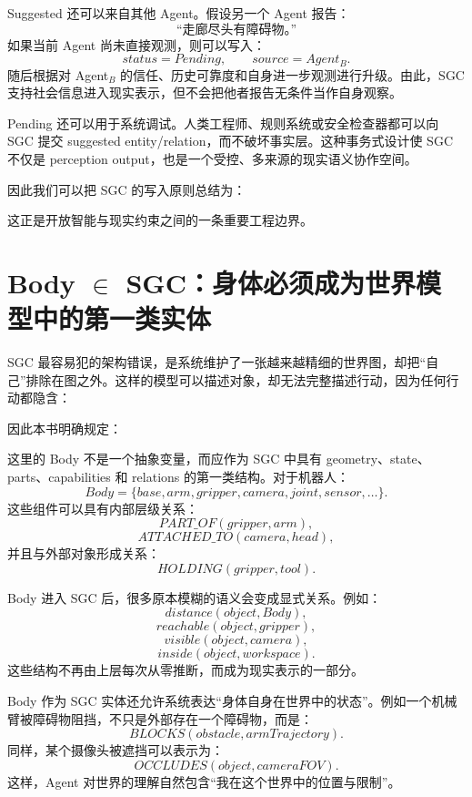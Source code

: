 Suggested 还可以来自其他 Agent。假设另一个 Agent 报告：
\[
\text{“走廊尽头有障碍物。”}
\]
如果当前 Agent 尚未直接观测，则可以写入：
\[
status=Pending,
\qquad
source=Agent_B.
\]
随后根据对 Agent$_B$ 的信任、历史可靠度和自身进一步观测进行升级。由此，SGC 支持社会信息进入现实表示，但不会把他者报告无条件当作自身观察。

Pending 还可以用于系统调试。人类工程师、规则系统或安全检查器都可以向 SGC 提交 suggested entity/relation，而不破坏事实层。这种事务式设计使 SGC 不仅是 perception output，也是一个受控、多来源的现实语义协作空间。

因此我们可以把 SGC 的写入原则总结为：
\begin{statementbox}
\centering
{}
\end{statementbox}
这正是开放智能与现实约束之间的一条重要工程边界。

\section{Body $\in$ SGC：身体必须成为世界模型中的第一类实体}

SGC 最容易犯的架构错误，是系统维护了一张越来越精细的世界图，却把“自己”排除在图之外。这样的模型可以描述对象，却无法完整描述行动，因为任何行动都隐含：
\begin{statementbox}
\centering
{}
\end{statementbox}
因此本书明确规定：
\begin{statementbox}
\centering
{}
\end{statementbox}

这里的 Body 不是一个抽象变量，而应作为 SGC 中具有 geometry、state、parts、capabilities 和 relations 的第一类结构。对于机器人：
\[
Body=
\{
base,
arm,
gripper,
camera,
joint,
sensor,
\ldots
\}.
\]
这些组件可以具有内部层级关系：
\[
PART\_OF(gripper,arm),
\]
\[
ATTACHED\_TO(camera,head),
\]
并且与外部对象形成关系：
\[
HOLDING(gripper,tool).
\]

Body 进入 SGC 后，很多原本模糊的语义会变成显式关系。例如：
\[
distance(object,Body),
\]
\[
reachable(object,gripper),
\]
\[
visible(object,camera),
\]
\[
inside(object,workspace).
\]
这些结构不再由上层每次从零推断，而成为现实表示的一部分。

Body 作为 SGC 实体还允许系统表达“身体自身在世界中的状态”。例如一个机械臂被障碍物阻挡，不只是外部存在一个障碍物，而是：
\[
BLOCKS(obstacle,armTrajectory).
\]
同样，某个摄像头被遮挡可以表示为：
\[
OCCLUDES(object,cameraFOV).
\]
这样，Agent 对世界的理解自然包含“我在这个世界中的位置与限制”。

